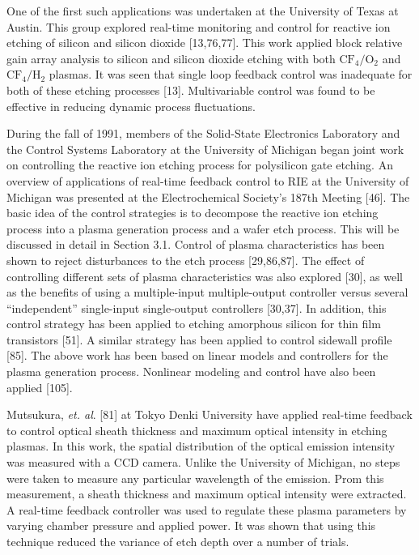 {{{			
One of the first such applications was undertaken at the University of Texas at Austin. This group explored real-time monitoring and control for reactive ion etching of silicon and silicon dioxide [13,76,77]. This work applied block relative gain array analysis to silicon and silicon dioxide etching with both $\text{CF}_{4}/\text{O}_{2}$ and $\text{CF}_{4}/\text{H}_{2}$ plasmas. It was seen that single loop feedback control was inadequate for both of these etching processes [13]. Multivariable control was found to be effective in reducing dynamic process fluctuations.
			
			
During the fall of 1991, members of the Solid-State Electronics Laboratory and the Control Systems Laboratory at the University of Michigan began joint work on controlling the reactive ion etching process for polysilicon gate etching. An overview of applications of real-time feedback control to RIE at the University of Michigan was presented at the Electrochemical Society’s 187th Meeting [46]. The basic idea of the control strategies is to decompose the reactive ion etching process into a plasma generation process and a wafer etch process. This will be discussed in detail in Section 3.1. Control of plasma characteristics has been shown to reject disturbances to the etch process [29,86,87]. The effect of controlling different sets of plasma characteristics was also explored [30], as well as the benefits of using a multiple-input multiple-output controller versus several “independent” single-input single-output controllers [30,37]. In addition, this control strategy has been applied to etching amorphous silicon for thin film transistors [51]. A similar strategy has been applied to control sidewall profile [85]. The above work has been based on linear models and controllers for the plasma generation process. Nonlinear modeling and control have also been applied [105].
			
Mutsukura, \textit{et. al}. [81] at Tokyo Denki University have applied real-time feedback to control optical sheath thickness and maximum optical intensity in etching plasmas. In this work, the spatial distribution of the optical emission intensity was measured with a CCD camera. Unlike the University of Michigan, no steps were taken to measure any particular wavelength of the emission. Prom this measurement, a sheath thickness and maximum optical intensity were extracted. A real-time feedback controller was used to regulate these plasma parameters by varying chamber pressure and applied power. It was shown that using this technique reduced the variance of etch depth over a number of trials.
			
}}}
